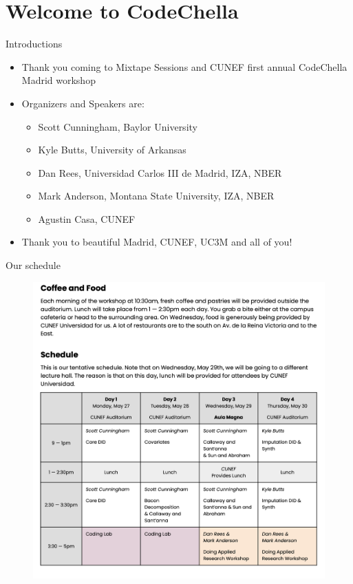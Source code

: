 \documentclass{beamer}
\begin{document}




\section{Welcome to CodeChella}


\begin{frame}{Introductions}

\begin{itemize}
\item Thank you coming to Mixtape Sessions and CUNEF first annual CodeChella Madrid workshop
\item Organizers and Speakers are:
	\begin{itemize}
	\item Scott Cunningham, Baylor University
	\item Kyle Butts, University of Arkansas
	\item Dan Rees, Universidad Carlos III de Madrid, IZA, NBER
	\item Mark Anderson, Montana State University, IZA, NBER
	\item Agustin Casa, CUNEF
	\end{itemize}
\item Thank you to beautiful Madrid, CUNEF, UC3M and all of you!
\end{itemize}

\end{frame}

\begin{frame}{Our schedule}
\begin{figure}
\includegraphics[width=\textwidth, height=0.8\textheight, keepaspectratio]{./lecture_includes/codechella_madrid_2024}
\end{figure}
\end{frame}
\end{document}
